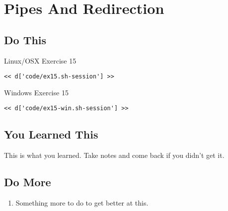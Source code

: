 \chapter{Pipes And Redirection}

\section{Do This}

\begin{code}{Linux/OSX Exercise 15}
\begin{Verbatim}
<< d['code/ex15.sh-session'] >>
\end{Verbatim}
\end{code}

\begin{code}{Windows Exercise 15}
\begin{Verbatim}
<< d['code/ex15-win.sh-session'] >>
\end{Verbatim}
\end{code}

\section{You Learned This}

This is what you learned.  Take notes and come back if you didn't get it.

\section{Do More}

\begin{enumerate}
\item Something more to do to get better at this.
\end{enumerate}

